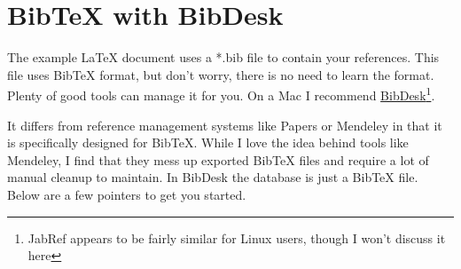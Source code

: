 \section{BibTeX with BibDesk}

The example LaTeX document uses a *.bib file to contain your references.  This file uses BibTeX format, but don't worry, there is no need to learn the format.  Plenty of good tools can manage it for you.  On a Mac I recommend \href{https://bibdesk.sourceforge.io}{BibDesk}\footnote{JabRef appears to be fairly similar for Linux users, though I won't discuss it here}.

It differs from reference management systems like Papers or Mendeley in that it is specifically designed for BibTeX.  While I love the idea behind tools like Mendeley, I find that they mess up exported BibTeX files and require a lot of manual cleanup to maintain.  In BibDesk the database is just a BibTeX file.  Below are a few pointers to get you started.

